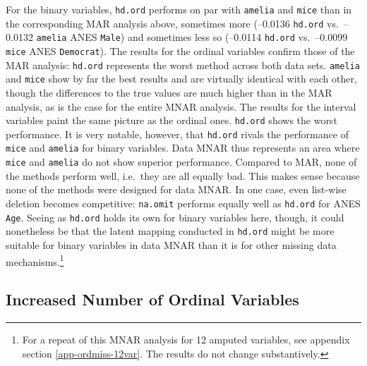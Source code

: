 \documentclass[12pt,econ]{sources/authesis}
\begin{document}
For the binary variables, \texttt{hd.ord} performs on par with \texttt{amelia} and \texttt{mice} than in the corresponding MAR analysis above, sometimes more (--0.0136 \texttt{hd.ord} vs.~--0.0132 \texttt{amelia} ANES \texttt{Male}) and sometimes less so (--0.0114 \texttt{hd.ord} vs.~--0.0099 \texttt{mice} ANES \texttt{Democrat}). The results for the ordinal variables confirm those of the MAR analysis: \texttt{hd.ord} represents the worst method across both data sets. \texttt{amelia} and \texttt{mice} show by far the best results and are virtually identical with each other, though the differences to the true values are much higher than in the MAR analysis, as is the case for the entire MNAR analysis. The results for the interval variables paint the same picture as the ordinal ones. \texttt{hd.ord} shows the worst performance. It is very notable, however, that \texttt{hd.ord} rivals the performance of \texttt{mice} and \texttt{amelia} for binary variables. Data MNAR thus represents an area where \texttt{mice} and \texttt{amelia} do not show superior performance. Compared to MAR, none of the methods perform well, i.e.~they are all equally bad. This makes sense because none of the methods were designed for data MNAR. In one case, even list-wise deletion becomes competitive: \texttt{na.omit} performs equally well as \texttt{hd.ord} for ANES \texttt{Age}. Seeing as \texttt{hd.ord} holds its own for binary variables here, though, it could nonetheless be that the latent mapping conducted in \texttt{hd.ord} might be more suitable for binary variables in data MNAR than it is for other missing data mechanisms.\footnote{For a repeat of this MNAR analysis for 12 amputed variables, see appendix section \ref{app-ordmiss-12var}. The results do not change substantively.}

\hypertarget{ordmiss-results-increaseOrd}{%
\subsection{Increased Number of Ordinal Variables}\label{ordmiss-results-increaseOrd}}
\end{document}
